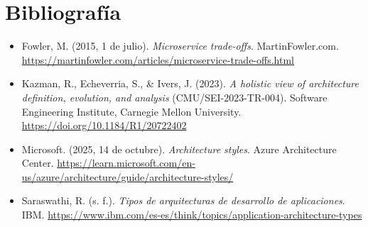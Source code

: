 \documentclass[12pt]{article}
\begin{document}
	\section*{Bibliografía}
	
	\begin{itemize}[
		leftmargin=1.27cm,
		label={},
		itemindent=-1.27cm,
		itemsep=6pt
		]
		
		\item Fowler, M. (2015, 1 de julio).
		\textit{Microservice trade-offs}.
		MartinFowler.com.
		\url{https://martinfowler.com/articles/microservice-trade-offs.html}
		
		\item Kazman, R., Echeverria, S., \& Ivers, J. (2023).
		\textit{A holistic view of architecture definition, evolution,
			and analysis} (CMU/SEI-2023-TR-004).
		Software Engineering Institute, Carnegie Mellon University.
		\url{https://doi.org/10.1184/R1/20722402}
		
		\item Microsoft. (2025, 14 de octubre).
		\textit{Architecture styles}.
		Azure Architecture Center.
		\url{https://learn.microsoft.com/en-us/azure/architecture/guide/architecture-styles/}
		
		\item Saraswathi, R. (s. f.).
		\textit{Tipos de arquitecturas de desarrollo de aplicaciones}.
		IBM.
		\url{https://www.ibm.com/es-es/think/topics/application-architecture-types}
	\end{itemize}
	
\end{document}
